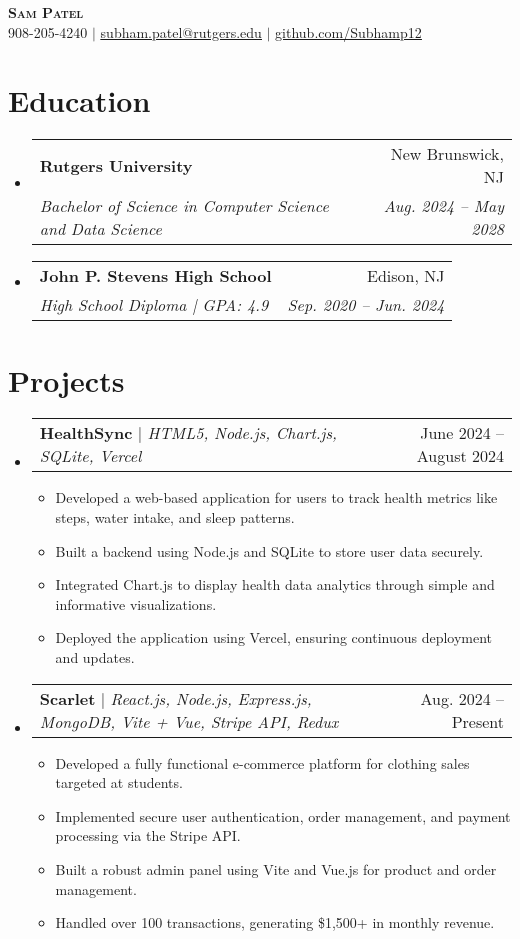 \documentclass[letterpaper,11pt]{article}
\makeatletter
\newcommand{\resumeItem}[1]{
  \item\small{
    {#1 \vspace{-2pt}}
  }
}
\newcommand{\resumeSubheading}[4]{
  \vspace{-2pt}\item
    \begin{tabular*}{0.97\textwidth}[t]{l@{\extracolsep{\fill}}r}
      \textbf{#1} & #2 \\
      \textit{\small#3} & \textit{\small #4} \\
    \end{tabular*}\vspace{-7pt}
}
\newcommand{\resumeProjectHeading}[2]{
    \item
    \begin{tabular*}{0.97\textwidth}{l@{\extracolsep{\fill}}r}
      \small#1 & #2 \\
    \end{tabular*}\vspace{-7pt}
}
\newcommand{\resumeSubHeadingListStart}{\begin{itemize}[leftmargin=0.15in, label={}]}
\newcommand{\resumeSubHeadingListEnd}{\end{itemize}}
\newcommand{\resumeItemListStart}{\begin{itemize}}
\newcommand{\resumeItemListEnd}{\end{itemize}\vspace{-5pt}}
\makeatother
\begin{document}
\begin{center}
    \textbf{\Huge \scshape Sam Patel} \\ \vspace{1pt}
    \small 908-205-4240 $|$ \href{mailto:subham.patel@rutgers.edu}{\underline{subham.patel@rutgers.edu}} $|$ 
    \href{https://github.com/Subhamp12}{\underline{github.com/Subhamp12}}
\end{center}

\section{Education}
  \resumeSubHeadingListStart
    \resumeSubheading
      {Rutgers University}{New Brunswick, NJ}
      {Bachelor of Science in Computer Science and Data Science}{Aug. 2024 -- May 2028}
    \resumeSubheading
      {John P. Stevens High School}{Edison, NJ}
      {High School Diploma | GPA: 4.9}{Sep. 2020 -- Jun. 2024}
  \resumeSubHeadingListEnd

\section{Projects}
    \resumeSubHeadingListStart
      \resumeProjectHeading
          {\textbf{HealthSync} $|$ \emph{HTML5, Node.js, Chart.js, SQLite, Vercel}}{June 2024 -- August 2024}
          \resumeItemListStart
            \resumeItem{Developed a web-based application for users to track health metrics like steps, water intake, and sleep patterns.}
            \resumeItem{Built a backend using Node.js and SQLite to store user data securely.}
            \resumeItem{Integrated Chart.js to display health data analytics through simple and informative visualizations.}
            \resumeItem{Deployed the application using Vercel, ensuring continuous deployment and updates.}
          \resumeItemListEnd
      \resumeProjectHeading
          {\textbf{Scarlet} $|$ \emph{React.js, Node.js, Express.js, MongoDB, Vite + Vue, Stripe API, Redux}}{Aug. 2024 -- Present}
          \resumeItemListStart
            \resumeItem{Developed a fully functional e-commerce platform for clothing sales targeted at students.}
            \resumeItem{Implemented secure user authentication, order management, and payment processing via the Stripe API.}
            \resumeItem{Built a robust admin panel using Vite and Vue.js for product and order management.}
            \resumeItem{Handled over 100 transactions, generating \$1,500+ in monthly revenue.}
          \resumeItemListEnd
    \resumeSubHeadingListEnd
\end{document}
